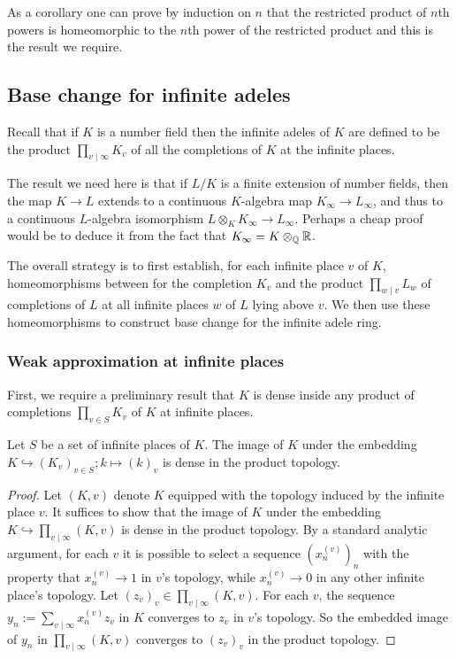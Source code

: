 As a corollary one can prove by induction on $n$ that the restricted product of $n$th powers
is homeomorphic to the $n$th power of the restricted product and this is the result
we require.

\subsection{Base change for infinite adeles}

Recall that if $K$ is a number field then the infinite adeles of $K$ are defined
to be the product $\prod_{v\mid\infty} K_v$ of all the completions of $K$ at the
infinite places.

The result we need here is that if $L/K$ is a finite extension of number fields,
then the map $K\to L$ extends to a continuous $K$-algebra map $K_\infty\to L_\infty$,
and thus to a continuous $L$-algebra isomorphism $L\otimes_KK_\infty\to L_\infty$.
Perhaps a cheap proof would be to deduce it from the fact that $K_\infty=K\otimes_{\mathbb{Q}}\mathbb{R}$.

The overall strategy is to first establish, for each infinite place $v$ of $K$, homeomorphisms
between for the completion $K_v$ and the product $\prod_{w\mid v}L_w$ of completions of $L$ at
all infinite places $w$ of $L$ lying above $v$.
We then use these homeomorphisms to construct base change for the infinite adele ring.

\subsubsection{Weak approximation at infinite places}

First, we require a preliminary result that $K$ is dense inside any product of
completions $\prod_{v\in S} K_v$ of $K$ at infinite places.

\begin{theorem}
  \label{NumberField.InfinitePlace.Completion.denseRange_algebraMap_subtype_pi}
  \leanok
  Let $S$ be a set of infinite places of $K$. The image of $K$ under the embedding
  $K\hookrightarrow (K_v)_{v\in S}; k \mapsto (k)_v$ is dense in the product topology.
\end{theorem}
\begin{proof}
  Let $(K, v)$ denote $K$ equipped with the topology induced by the infinite place $v$.
  It suffices to show that the image of $K$ under the embedding
  $K\hookrightarrow \prod_{v\mid \infty}(K, v)$ is dense in the product topology.
  By a standard analytic argument, for each $v$ it is possible to select a sequence $(x_n^{(v)})_n$
  with the property that $x_n^{(v)} \to 1$ in $v$'s topology, while $x_n^{(v)} \to 0$ in any other
  infinite place's topology.
  Let $(z_v)_v \in \prod_{v\mid \infty}(K, v)$.
  For each $v$, the sequence $y_n := \sum_{v\mid\infty} x_n^{(v)}z_v$ in $K$ converges to
  $z_v$ in $v$'s topology.
  So the embedded image of $y_n$ in $\prod_{v\mid \infty}(K, v)$ converges to $(z_v)_v$ in the
  product topology.
\end{proof}

